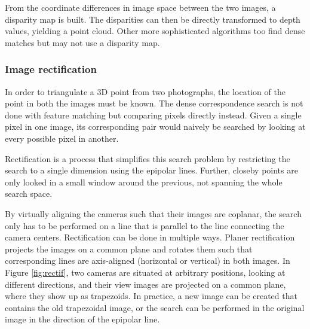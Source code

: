 From the coordinate differences in image space between the two images, a disparity map is built.
The disparities can then be directly transformed to depth values, yielding a point cloud.
Other more sophisticated algorithms too find dense matches but may not use a disparity map.


\subsubsection{Image rectification} %


In order to triangulate a 3D point from two photographs, the location of the point in both the images must be known.
The dense correspondence search is not done with feature matching but comparing pixels directly instead.
Given a single pixel in one image, its corresponding pair would naively be searched by looking at every possible pixel in another.

Rectification is a process that simplifies this search problem by restricting the search to a single dimension using the epipolar lines.
Further, closeby points are only looked in a small window around the previous, not spanning the whole search space.

By virtually aligning the cameras such that their images are coplanar, the search only has to be performed on a line that is parallel to the line connecting the camera centers.
Rectification can be done in multiple ways.
Planer rectification projects the images on a common plane and rotates them such that corresponding lines are axis-aligned (horizontal or vertical) in both images. \cite{hartley03multiview}
In Figure \ref{fig:rectif}, two cameras are situated at arbitrary positions, looking at different directions, and their view images are projected on a common plane, where they show up as trapezoids.
In practice, a new image can be created that contains the old trapezoidal image, or the search can be performed in the original image in the direction of the epipolar line.




